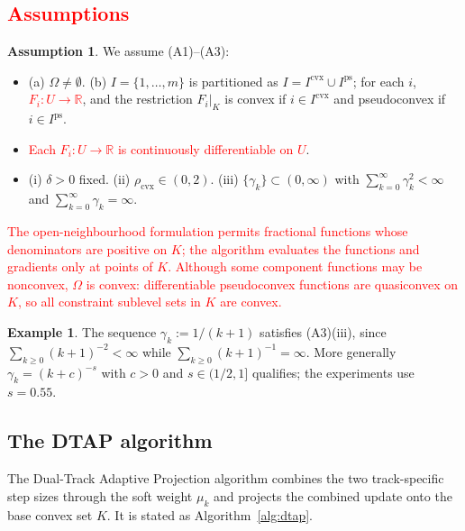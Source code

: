 \documentclass[]{interact}
\theoremstyle{plain}
\theoremstyle{definition}
\newtheorem{example}[theorem]{Example}
\newtheorem{assumption}{Assumption}
\theoremstyle{remark}
\newcommand{\R}{\mathbb{R}}
\newcommand{\cvx}{\mathrm{cvx}}
\newcommand{\ps}{\mathrm{ps}}
\begin{document}
\subsection{\textcolor{red}{Assumptions}}\label{ssec:assumptions}
\begin{assumption}\label{ass:standing}
We assume \textup{(A1)--(A3)}:
\begin{itemize}[leftmargin=2.4em,itemsep=2pt]
\item[\textup{(A1)}] \textup{(a)} $\Omega\ne\emptyset$. \textup{(b)} $I=\{1,\dots,m\}$
is partitioned as $I=I^{\cvx}\cup I^{\ps}$; for each $i$, \leavevmode\textcolor{red}{$F_i:U\to\R$}, and the
restriction $F_i|_K$ is convex if $i\in I^{\cvx}$ and pseudoconvex if $i\in I^{\ps}$.
\item[\textup{(A2)}] \leavevmode\textcolor{red}{Each $F_i:U\to\R$ is continuously differentiable on $U$}.
\item[\textup{(A3)}] \textup{(i)} $\delta>0$ fixed. \textup{(ii)}
$\rho_{\cvx}\in(0,2)$. \textup{(iii)} $\{\gamma_k\}\subset(0,\infty)$ with
$\sum_{k=0}^\infty\gamma_k^2<\infty$ and $\sum_{k=0}^\infty\gamma_k=\infty$.
\end{itemize}
\end{assumption}
\leavevmode\textcolor{red}{The open-neighbourhood formulation permits fractional functions whose denominators are
positive on $K$; the algorithm evaluates the functions and gradients only at points of $K$.
Although some component functions may be nonconvex, $\Omega$ is convex: differentiable
pseudoconvex functions are quasiconvex on $K$, so all constraint sublevel sets in $K$ are convex.}
\begin{example}\label{ex:gamma}
The sequence $\gamma_k:=1/(k+1)$ satisfies (A3)(iii), since $\sum_{k\ge0}(k+1)^{-2}<\infty$
while $\sum_{k\ge0}(k+1)^{-1}=\infty$. More generally $\gamma_k=(k+c)^{-s}$ with $c>0$
and $s\in(1/2,1]$ qualifies; the experiments use $s=0.55$.
\end{example}

\subsection{The DTAP algorithm}\label{ssec:algorithm}
The Dual-Track Adaptive Projection algorithm combines the two track-specific step sizes
through the soft weight $\mu_k$ and projects the combined update onto the base convex
set $K$. It is stated as Algorithm~\ref{alg:dtap}.
\end{document}
